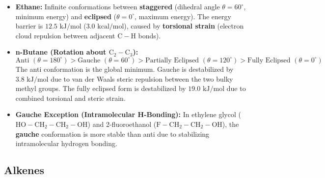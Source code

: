 \documentclass[10pt,a4paper]{article}
\begin{document}
\begin{usecasebox}
\begin{itemize}
  \item \textbf{Ethane:} Infinite conformations between \textbf{staggered} (dihedral angle $\theta = 60^\circ$, minimum energy) and \textbf{eclipsed} ($\theta = 0^\circ$, maximum energy). The energy barrier is $12.5\text{ kJ/mol}$ ($3.0\text{ kcal/mol}$), caused by \textbf{torsional strain} (electron cloud repulsion between adjacent $\mathrm{C-H}$ bonds).
  \item \textbf{n-Butane (Rotation about $\mathrm{C}_2-\mathrm{C}_3$):}
  \begin{equation}
    \text{Anti } (\theta=180^\circ) > \text{Gauche } (\theta=60^\circ) > \text{Partially Eclipsed } (\theta=120^\circ) > \text{Fully Eclipsed } (\theta=0^\circ)
  \end{equation}
  The anti conformation is the global minimum. Gauche is destabilized by $3.8\text{ kJ/mol}$ due to van der Waals steric repulsion between the two bulky methyl groups. The fully eclipsed form is destabilized by $19.0\text{ kJ/mol}$ due to combined torsional and steric strain.
  \item \textbf{Gauche Exception (Intramolecular H-Bonding):} In ethylene glycol ($\mathrm{HO-CH_2-CH_2-OH}$) and 2-fluoroethanol ($\mathrm{F-CH_2-CH_2-OH}$), the \textbf{gauche} conformation is more stable than anti due to stabilizing intramolecular hydrogen bonding.
\end{itemize}
\end{usecasebox}

\subsection{Alkenes}
\end{document}
